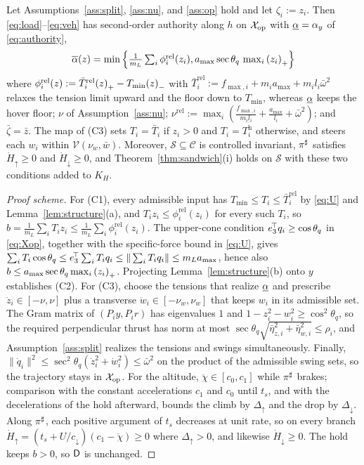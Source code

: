 \begin{proposition}\label{prop:instance}
Let Assumptions~\ref{ass:split}, \ref{ass:nu}, and \ref{ass:op} hold and let $\zeta_i:=z_i$. Then \eqref{eq:load}--\eqref{eq:veh} has second-order authority along $h$ on $\mathcal{X}_{\mathrm{op}}$ with $\underline{\alpha}=\alpha_y$ of \eqref{eq:authority},
\begin{align}
\overline{\alpha}(z)=\min\Big\{\tfrac{1}{m_L}\textstyle\sum_i\phi^{\mathrm{rel}}_i(z_i),a_{\max}\sec\theta_q\,\max_i{(z_i)}_{+}\Big\}\nonumber
\end{align}
where $\phi^{\mathrm{rel}}_i(z):=\bar T^{\mathrm{rel}}_i{(z)}_{+}-T_{\min}{(z)}_{-}$ with $\bar T_i^{\mathrm{rel}}:=f_{\max,i}+m_ia_{\max}+m_il_i\bar\omega^2$ relaxes the tension limit upward and the floor down to $T_{\min}$, whereas $\underline{\alpha}$ keeps the hover floor; $\nu$ of Assumption~\ref{ass:nu}; $\nu^{\mathrm{rel}}:=\max_i(\frac{f_{\max,i}}{m_il_i}+\frac{a_{\max}}{l_i}+\bar\omega^2)$; and $\bar\zeta=\bar z$. The map of (C3) sets $T_i=\bar T_i$ if $z_i>0$ and $T_i=T^{\mathrm h}_i$ otherwise, and steers each $w_i$ within $\mathcal{V}(\nu_w,\bar w)$. Moreover, $\mathcal{S}\subseteq\mathcal C$ is controlled invariant, $\pi^{\sharp}$ satisfies $\dot H_\uparrow\ge0$ and $\dot H_\downarrow\ge0$, and Theorem~\ref{thm:sandwich}(i) holds on $\mathcal S$ with these two conditions added to $K_H$.
\end{proposition}

\begin{proof}[Proof scheme]
For (C1), every admissible input has $T_{\min}\le T_i\le\bar T^{\mathrm{rel}}_i$ by \eqref{eq:U} and Lemma~\ref{lem:structure}(a), and $T_iz_i\le\phi^{\mathrm{rel}}_i(z_i)$ for every such $T_i$, so $b=\frac{1}{m_L}\sum_iT_iz_i\le\frac{1}{m_L}\sum_i\phi^{\mathrm{rel}}_i(z_i)$. The upper-cone condition $e_3^{\!\top} q_i\ge\cos\theta_q$ in \eqref{eq:Xop}, together with the specific-force bound in \eqref{eq:U}, gives $\sum_iT_i\cos\theta_q\le e_3^{\!\top}\sum_iT_iq_i\le\|\sum_iT_iq_i\|\le m_La_{\max}$, hence also $b\le a_{\max}\sec\theta_q\max_i{(z_i)}_{+}$. Projecting Lemma~\ref{lem:structure}(b) onto $y$ establishes (C2). For (C3), choose the tensions that realize $\underline{\alpha}$ and prescribe $\ddot z_i\in[-\nu,\nu]$ plus a transverse $\ddot w_i\in[-\nu_w,\nu_w]$ that keeps $w_i$ in its admissible set. The Gram matrix of $(P_iy,P_ir)$ has eigenvalues $1$ and $1-z_i^2-w_i^2\ge\cos^2\theta_q$, so the required perpendicular thrust has norm at most $\sec\theta_q\sqrt{\bar\eta_{z,i}^2+\bar\eta_{w,i}^2}\le\rho_i$, and Assumption~\ref{ass:split} realizes the tensions and swings simultaneously. Finally, $\|\dot q_i\|^2\le\sec^2\theta_q(\dot z_i^2+\dot w_i^2)\le\bar\omega^2$ on the product of the admissible swing sets, so the trajectory stays in $\mathcal{X}_{\mathrm{op}}$. For the altitude, $\ddot\chi\in[c_0,c_1]$ while $\pi^{\sharp}$ brakes; comparison with the constant accelerations $c_1$ and $c_0$ until $t_s$, and with the decelerations of the hold afterward, bounds the climb by $\Delta_\uparrow$ and the drop by $\Delta_\downarrow$. Along $\pi^{\sharp}$, each positive argument of $t_s$ decreases at unit rate, so on every branch $\dot H_\uparrow=(t_s+U/c_\downarrow)(c_1-\ddot\chi)\ge0$ where $\Delta_\uparrow>0$, and likewise $\dot H_\downarrow\ge0$. The hold keeps $b>0$, so $\mathsf{D}$ is unchanged.
\end{proof}

